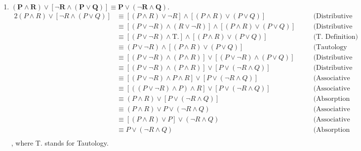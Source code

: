 \begin{enumerate}[label=(\alph*)]
    \item \textbf{$\bm{(P \wedge R) \vee [\neg R \wedge (P \vee Q)] \equiv P \vee (\neg R \wedge Q).}$}
        \begin{alignat*}{2}
            (P \wedge R) \vee [\neg R \wedge (P \vee Q)] & \equiv [(P \wedge R) \vee \neg R] \wedge [(P \wedge R) \vee (P \vee Q)] && \quad \text{(Distributive Law)} \\
            & \equiv [(P \vee \neg R) \wedge (R \vee \neg R)] \wedge [(P \wedge R) \vee (P \vee Q)] && \quad \text{(Distributive Law)} \\
            & \equiv [(P \vee \neg R) \wedge \text{T.}] \wedge [(P \wedge R) \vee (P \vee Q)] && \quad \text{(T. Definition)} \\
            & \equiv (P \vee \neg R) \wedge [(P \wedge R) \vee (P \vee Q)] && \quad \text{(Tautology Law)} \\
            & \equiv [(P \vee \neg R) \wedge (P \wedge R)] \vee [(P \vee \neg R) \wedge (P \vee Q)] && \quad \text{(Distributive Law)} \\
            & \equiv [(P \vee \neg R) \wedge (P \wedge R)] \vee [P \vee (\neg R \wedge Q)] && \quad \text{(Distributive Law)} \\
            & \equiv [(P \vee \neg R) \wedge P \wedge R] \vee [P \vee (\neg R \wedge Q)] && \quad \text{(Associative Law)} \\
            & \equiv [((P \vee \neg R) \wedge P) \wedge R] \vee [P \vee (\neg R \wedge Q)] && \quad \text{(Associative Law)} \\
            & \equiv (P \wedge R) \vee [P \vee (\neg R \wedge Q)] && \quad \text{(Absorption Law)} \\
            & \equiv (P \wedge R) \vee P \vee (\neg R \wedge Q) && \quad \text{(Associative Law)} \\
            & \equiv [(P \wedge R) \vee P] \vee (\neg R \wedge Q) && \quad \text{(Associative Law)} \\
            & \equiv P \vee (\neg R \wedge Q) && \quad \text{(Absorption Law)} \\
        \end{alignat*}
        , where T. stands for Tautology.
\end{enumerate}

\pagebreak